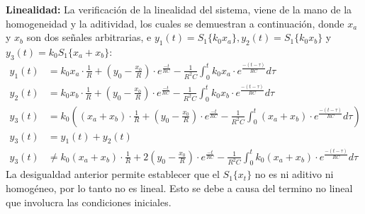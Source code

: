 \documentclass[12pt,a4paper]{report}
\begin{document}
\begin{enumerate}[label=\alph*)]
      \textbf{Linealidad:} La verificación de la linealidad del sistema, viene de la mano de la homogeneidad y la aditividad,
      los cuales se demuestran a continuación, donde $x_a$ y $x_b$ son dos señales arbitrarias, e $y_1(t) = S_1\{k_0x_a\},
      y_2(t) = S_1\{k_0x_b\}$ y $y_3(t) = k_0S_1\{x_a + x_b\}$:
      \begin{align*}
        y_1(t) &= k_0x_a \cdot \frac{1}{R} + \left(y_0 - \frac{x_0}{R}\right) \cdot
          e^{\frac{-t}{RC}} - \frac{1}{R^2C} \int_{0}^{t} k_0x_a \cdot e^{\frac{-(t-\tau)}{RC}} d\tau\\[12pt]
        y_2(t) &= k_0x_b \cdot \frac{1}{R} + \left(y_0 - \frac{x_0}{R}\right) \cdot
          e^{\frac{-t}{RC}} - \frac{1}{R^2C} \int_{0}^{t} k_0x_b \cdot e^{\frac{-(t-\tau)}{RC}} d\tau\\[12pt]
        y_3(t) &= k_0\left((x_a + x_b) \cdot \frac{1}{R} + \left(y_0 - \frac{x_0}{R}\right) \cdot e^{\frac{-t}{RC}} -
          \frac{1}{R^2C} \int_{0}^{t} (x_a + x_b) \cdot e^{\frac{-(t-\tau)}{RC}} d\tau\right)\\[12pt]
        y_3(t) &= y_1(t) + y_2(t)\\[6pt]
        y_3(t) &\neq k_0(x_a + x_b) \cdot \frac{1}{R} + 2\left(y_0 - \frac{x_0}{R}\right) \cdot
          e^{\frac{-t}{RC}} - \frac{1}{R^2C} \int_{0}^{t} k_0(x_a + x_b) \cdot e^{\frac{-(t-\tau)}{RC}} d\tau
      \end{align*}
      La desigualdad anterior permite establecer que el $S_1\{x_t\}$ no es ni aditivo ni homogéneo, por lo tanto no es
      lineal. Esto se debe a causa del termino no lineal que involucra las condiciones iniciales.\\


\end{enumerate}
\end{document}
